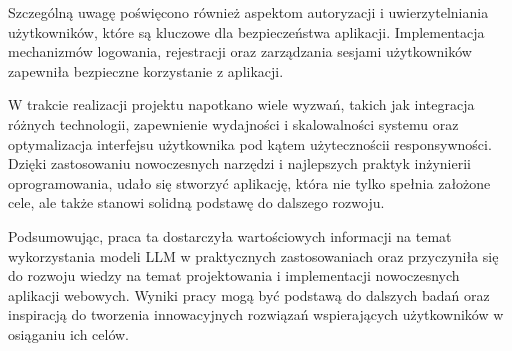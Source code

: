 Szczególną uwagę poświęcono również aspektom autoryzacji i uwierzytelniania użytkowników, które są kluczowe dla bezpieczeństwa aplikacji. Implementacja mechanizmów logowania, rejestracji oraz zarządzania sesjami użytkowników zapewniła bezpieczne korzystanie z aplikacji.

W trakcie realizacji projektu napotkano wiele wyzwań, takich jak integracja różnych technologii, zapewnienie wydajności i skalowalności systemu oraz optymalizacja interfejsu użytkownika pod kątem użyteczności\linebreak i responsywności. Dzięki zastosowaniu nowoczesnych narzędzi i najlepszych praktyk inżynierii oprogramowania, udało się stworzyć aplikację, która nie tylko spełnia założone cele, ale także stanowi solidną podstawę do dalszego rozwoju.

Podsumowując, praca ta dostarczyła wartościowych informacji na temat wykorzystania modeli LLM w praktycznych zastosowaniach oraz przyczyniła się do rozwoju wiedzy na temat projektowania i implementacji nowoczesnych aplikacji webowych. Wyniki pracy mogą być podstawą do dalszych badań oraz inspiracją do tworzenia innowacyjnych rozwiązań wspierających użytkowników w osiąganiu ich celów.